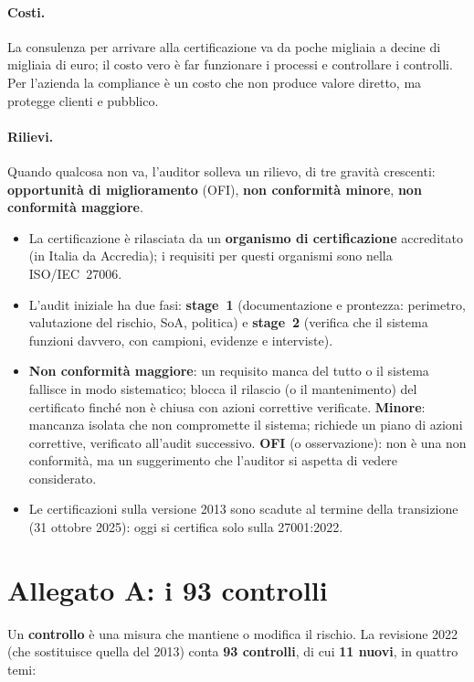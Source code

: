 \paragraph{Costi.} La consulenza per arrivare alla certificazione va da poche migliaia a decine di migliaia
di euro; il costo vero è far funzionare i processi e controllare i controlli. Per l'azienda la compliance è
un costo che non produce valore diretto, ma protegge clienti e pubblico.

\paragraph{Rilievi.} Quando qualcosa non va, l'auditor solleva un rilievo, di tre gravità crescenti:
\textbf{opportunità di miglioramento} (OFI), \textbf{non conformità minore}, \textbf{non conformità
maggiore}.

\begin{integrazione}
\begin{itemize}
  \item La certificazione è rilasciata da un \textbf{organismo di certificazione} accreditato (in Italia da
    Accredia); i requisiti per questi organismi sono nella ISO/IEC~27006.
  \item L'audit iniziale ha due fasi: \textbf{stage~1} (documentazione e prontezza: perimetro, valutazione del
    rischio, SoA, politica) e \textbf{stage~2} (verifica che il sistema funzioni davvero, con campioni,
    evidenze e interviste).
  \item \textbf{Non conformità maggiore}: un requisito manca del tutto o il sistema fallisce in modo
    sistematico; blocca il rilascio (o il mantenimento) del certificato finché non è chiusa con azioni
    correttive verificate. \textbf{Minore}: mancanza isolata che non compromette il sistema; richiede un piano
    di azioni correttive, verificato all'audit successivo. \textbf{OFI} (o osservazione): non è una non
    conformità, ma un suggerimento che l'auditor si aspetta di vedere considerato.
  \item Le certificazioni sulla versione 2013 sono scadute al termine della transizione (31 ottobre 2025):
    oggi si certifica solo sulla 27001:2022.
\end{itemize}
\end{integrazione}

\section{Allegato A: i 93 controlli}
\label{sec:iso-allegato-a}
Un \textbf{controllo} è una misura che mantiene o modifica il rischio. La revisione 2022 (che sostituisce
quella del 2013) conta \textbf{93 controlli}, di cui \textbf{11 nuovi}, in quattro temi:

